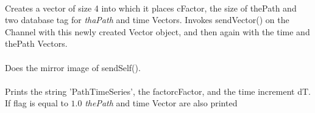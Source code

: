 \\
Creates a vector of size 4 into which it places \p cFactor, the
size of \p thePath and two  database tag for {\em 
thaPath} and \p time Vectors.  Invokes sendVector() on the
Channel with this newly created Vector object, and then again with the
\p time and \p thePath Vectors.\\

\\
Does the mirror image of sendSelf(). \\

\\
Prints the string 'PathTimeSeries', the factor\p cFactor, and the time
increment \p dT. If \p flag is equal to $1.0$ {\em
thePath} and \p time Vector are also printed\\
